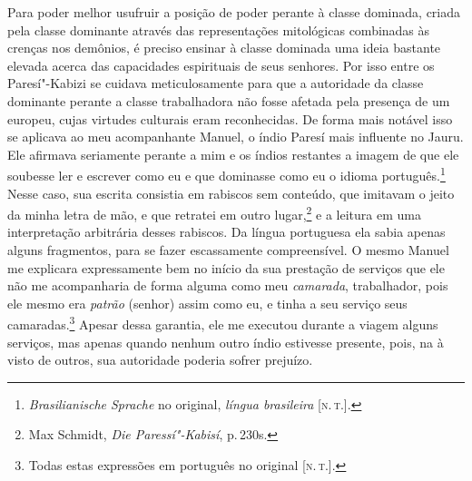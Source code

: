Para poder melhor usufruir a posição de poder perante à classe dominada,
criada pela classe dominante através das representações mitológicas
combinadas às crenças nos demônios, é preciso ensinar à classe dominada
uma ideia bastante elevada acerca das capacidades espirituais de seus
senhores. Por isso entre os Paresí"-Kabizi se cuidava meticulosamente
para que a autoridade da classe dominante perante a classe trabalhadora
não fosse afetada pela presença de um europeu, cujas virtudes culturais
eram reconhecidas. De forma mais notável isso se aplicava ao meu
acompanhante Manuel, o índio Paresí mais influente no Jauru. Ele
afirmava seriamente perante a mim e os índios restantes a imagem de que
ele soubesse ler e escrever como eu e que dominasse como eu o idioma
português.\footnote{\textit{Brasilianische Sprache} no original, \textit{língua
  brasileira} {[}\textsc{n.\,t.}{]}.} Nesse caso, sua escrita consistia em rabiscos sem conteúdo,
que imitavam o jeito da minha letra de mão, e que retratei em outro
lugar,\footnote{Max Schmidt, \textit{Die Paressí"-Kabisí}, p.\,230s.} e a leitura em uma interpretação arbitrária desses
rabiscos. Da língua portuguesa ela sabia apenas alguns fragmentos, para
se fazer escassamente compreensível. O mesmo Manuel me explicara
expressamente bem no início da sua prestação de serviços que ele não me
acompanharia de forma alguma como meu \textit{camarada}, trabalhador, pois ele
mesmo era \textit{patrão} (senhor) assim como eu, e tinha a seu serviço seus
camaradas.\footnote{Todas estas expressões em português no original {[}\textsc{n.\,t.}{]}.} Apesar dessa garantia, ele me executou durante a viagem
alguns serviços, mas apenas quando nenhum outro índio estivesse
presente, pois, na à visto de outros, sua autoridade poderia sofrer prejuízo.

